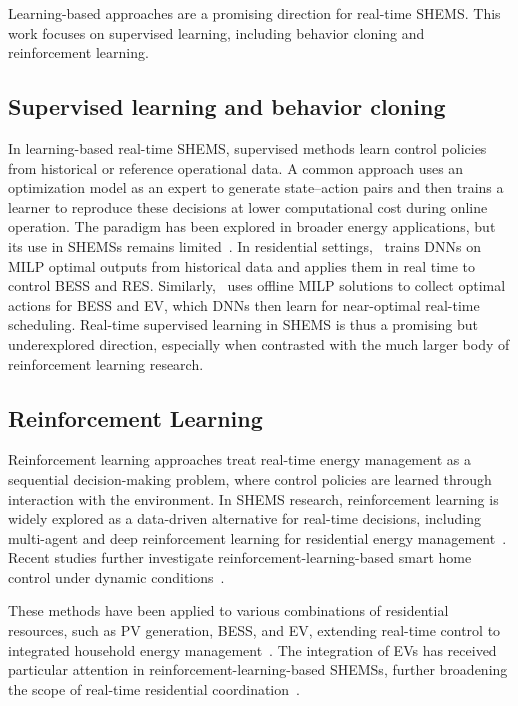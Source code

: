 \documentclass[preprint,12pt, 3p]{elsarticle}
\begin{document}
Learning-based approaches are a promising direction for real-time \gls{SHEMS}. This work focuses on supervised learning, including behavior cloning and reinforcement learning.

\subsection{Supervised learning and behavior cloning}

In learning-based real-time \gls{SHEMS}, supervised methods learn control policies from historical or reference operational data. A common approach uses an optimization model as an expert to generate state--action pairs and then trains a learner to reproduce these decisions at lower computational cost during online operation. The paradigm has been explored in broader energy applications, but its use in \glspl{SHEMS} remains limited~\cite{su2025accelerating-965,cao2023fast-d37}. In residential settings,~\cite{dinh2022supervised-learning-based-5bd} trains \glspl{DNN} on \gls{MILP} optimal outputs from historical data and applies them in real time to control \gls{BESS} and \gls{RES}. Similarly,~\cite{huy2023real-time-2cb} uses offline \gls{MILP} solutions to collect optimal actions for \gls{BESS} and \gls{EV}, which DNNs then learn for near-optimal real-time scheduling. Real-time supervised learning in \gls{SHEMS} is thus a promising but underexplored direction, especially when contrasted with the much larger body of reinforcement learning research.


\subsection{Reinforcement Learning}


Reinforcement learning approaches treat real-time energy management as a sequential decision-making problem, where control policies are learned through interaction with the environment. In \gls{SHEMS} research, reinforcement learning is widely explored as a data-driven alternative for real-time decisions, including multi-agent and deep reinforcement learning for residential energy management~\cite{xu2020multi-agent-ca4,yu2020deep-565}. Recent studies further investigate reinforcement-learning-based smart home control under dynamic conditions~\cite{chen2021user-98f,wu2024smart-6aa}.

These methods have been applied to various combinations of residential resources, such as \gls{PV} generation, \gls{BESS}, and \gls{EV}, extending real-time control to integrated household energy management~\cite{abdelaal2021integration-d54,kim2025real-time-979}. The integration of \glspl{EV} has received particular attention in reinforcement-learning-based \glspl{SHEMS}, further broadening the scope of real-time residential coordination~\cite{yuan2026reinforcement-dd1,spantideas2025autonomous-dfb}.
\end{document}
